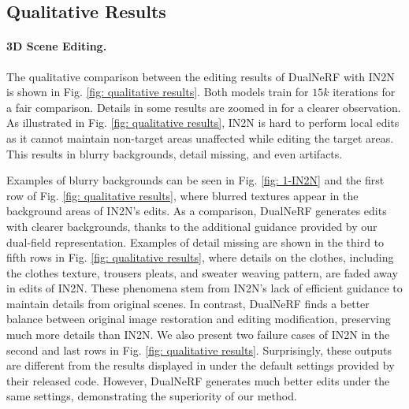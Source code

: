 \subsection{Qualitative Results}
\paragraph{3D Scene Editing.}
The qualitative comparison between the editing results of DualNeRF with IN2N is shown in Fig. \ref{fig: qualitative results}. Both models train for $15k$ iterations for a fair comparison. Details in some results are zoomed in for a clearer observation. As illustrated in Fig. \ref{fig: qualitative results}, IN2N is hard to perform local edits as it cannot maintain non-target areas unaffected while editing the target areas. This results in blurry backgrounds, detail missing, and even artifacts.

Examples of blurry backgrounds can be seen in Fig. \ref{fig: 1-IN2N} and the first row of Fig. \ref{fig: qualitative results}, where blurred textures appear in the background areas of IN2N's edits. As a comparison, DualNeRF generates edits with clearer backgrounds, thanks to the additional guidance provided by our dual-field representation. Examples of detail missing are shown in the third to fifth rows in Fig. \ref{fig: qualitative results}, where details on the clothes, including the clothes texture, trousers pleats, and sweater weaving pattern, are faded away in edits of IN2N. These phenomena stem from IN2N's lack of efficient guidance to maintain details from original scenes. In contrast, DualNeRF finds a better balance between original image restoration and editing modification, preserving much more details than IN2N.
We also present two failure cases of IN2N in the second and last rows in Fig. \ref{fig: qualitative results}. Surprisingly, these outputs are different from the results displayed in \cite{haque2023instruct} under the default settings provided by their released code. However, DualNeRF generates much better edits under the same settings, demonstrating the superiority of our method.


